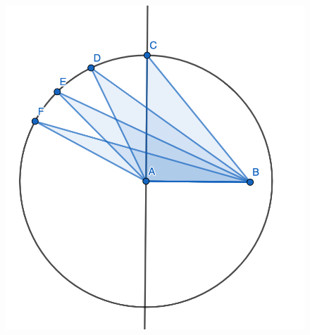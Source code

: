 \documentclass[
	11pt, %
]{beamer}
\begin{document}
\begin{frame}
\begin{columns}[t]
\begin{column}{0.45\textwidth}
		\pause
		\begin{figure}
			\includegraphics[width=\linewidth]{Pythagorean_Obtuse_Example_Question1.png}
		\end{figure}	

		\end{column}

	\end{columns}

\end{frame}

\end{document}

